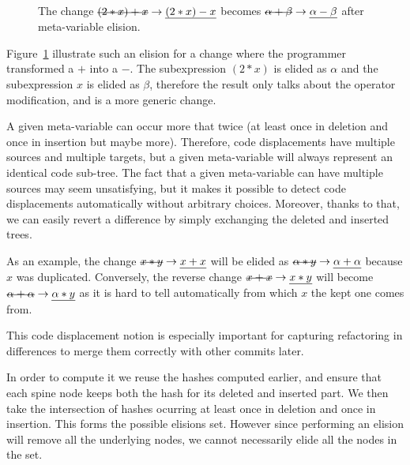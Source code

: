 \documentclass[a4paper,11pt]{article}
\newcommand\del[1]{\text{\st{$#1$}}}
\newcommand\ins[1]{\text{\ul{$#1$}}}
\newcommand\change[2]{\del{#1} \rightarrow \ins{#2}}
\begin{document}
\begin{figure}[ht]
\begin{minipage}{0.49\textwidth}
\end{minipage}
\caption{The change $\change{(2*x)+x}{(2*x)-x}$ becomes $\change{\alpha+\beta}
{\alpha-\beta}$ after meta-variable elision.}
\label{fig:metavar_elision}
\end{figure}

Figure~\ref{fig:metavar_elision} illustrate such an elision for a change where
the programmer transformed a $+$ into a $-$. The subexpression $(2*x)$ is
elided as $\alpha$ and the subexpression $x$ is elided as $\beta$, therefore
the result only talks about the operator modification, and is a more generic
change.

A given meta-variable can occur more that twice (at least once in deletion and
once in insertion but maybe more). Therefore, code displacements have multiple
sources and multiple targets, but a given meta-variable will always represent
an
identical code sub-tree. The fact that a given meta-variable can have multiple
sources may seem unsatisfying, but it makes it possible to detect code
displacements automatically without arbitrary choices. Moreover, thanks to
that,
we can easily revert a difference by simply exchanging the deleted and inserted
trees.

As an example, the change $\change{x*y}{x+x}$ will be elided as
$\change{\alpha*y}{\alpha+\alpha}$ because $x$ was duplicated.
Conversely, the reverse change $\change{x+x}{x*y}$ will become
$\change{\alpha+\alpha}{\alpha*y}$ as it is hard to tell automatically from
which $x$ the kept one comes from.

This code displacement notion is especially important for capturing refactoring
in differences to merge them correctly with other commits later.

In order to compute it we reuse the hashes computed earlier, and ensure that
each spine node keeps both the hash for its deleted and inserted part.
We then take the intersection of hashes ocurring at least once in deletion and
once in insertion. This forms the possible elisions set. However since
performing an elision will remove all the underlying nodes, we cannot
necessarily elide all the nodes in the set.
\end{document}
